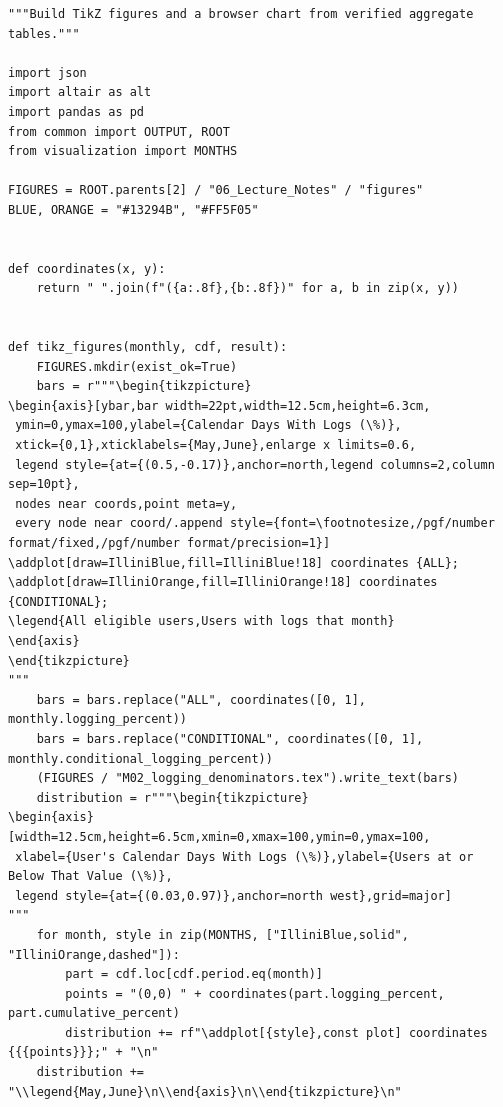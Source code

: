 \begin{Verbatim}[breaklines,breakanywhere,fontsize=\small]
"""Build TikZ figures and a browser chart from verified aggregate tables."""

import json
import altair as alt
import pandas as pd
from common import OUTPUT, ROOT
from visualization import MONTHS

FIGURES = ROOT.parents[2] / "06_Lecture_Notes" / "figures"
BLUE, ORANGE = "#13294B", "#FF5F05"


def coordinates(x, y):
    return " ".join(f"({a:.8f},{b:.8f})" for a, b in zip(x, y))


def tikz_figures(monthly, cdf, result):
    FIGURES.mkdir(exist_ok=True)
    bars = r"""\begin{tikzpicture}
\begin{axis}[ybar,bar width=22pt,width=12.5cm,height=6.3cm,
 ymin=0,ymax=100,ylabel={Calendar Days With Logs (\%)},
 xtick={0,1},xticklabels={May,June},enlarge x limits=0.6,
 legend style={at={(0.5,-0.17)},anchor=north,legend columns=2,column sep=10pt},
 nodes near coords,point meta=y,
 every node near coord/.append style={font=\footnotesize,/pgf/number format/fixed,/pgf/number format/precision=1}]
\addplot[draw=IlliniBlue,fill=IlliniBlue!18] coordinates {ALL};
\addplot[draw=IlliniOrange,fill=IlliniOrange!18] coordinates {CONDITIONAL};
\legend{All eligible users,Users with logs that month}
\end{axis}
\end{tikzpicture}
"""
    bars = bars.replace("ALL", coordinates([0, 1], monthly.logging_percent))
    bars = bars.replace("CONDITIONAL", coordinates([0, 1], monthly.conditional_logging_percent))
    (FIGURES / "M02_logging_denominators.tex").write_text(bars)
    distribution = r"""\begin{tikzpicture}
\begin{axis}[width=12.5cm,height=6.5cm,xmin=0,xmax=100,ymin=0,ymax=100,
 xlabel={User's Calendar Days With Logs (\%)},ylabel={Users at or Below That Value (\%)},
 legend style={at={(0.03,0.97)},anchor=north west},grid=major]
"""
    for month, style in zip(MONTHS, ["IlliniBlue,solid", "IlliniOrange,dashed"]):
        part = cdf.loc[cdf.period.eq(month)]
        points = "(0,0) " + coordinates(part.logging_percent, part.cumulative_percent)
        distribution += rf"\addplot[{style},const plot] coordinates {{{points}}};" + "\n"
    distribution += "\\legend{May,June}\n\\end{axis}\n\\end{tikzpicture}\n"

\end{Verbatim}
